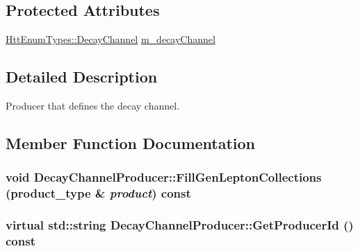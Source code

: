 \subsection*{Protected Attributes}
\begin{DoxyCompactItemize}
\item 
\hyperlink{classHttEnumTypes_a5e7e80b023df2c06dfd1e9c08f6efb35}{HttEnumTypes::DecayChannel} \hyperlink{classDecayChannelProducer_a4377dc18e06d6ddb5f7abbfb8a4b48e5}{m\_\-decayChannel}
\end{DoxyCompactItemize}


\subsection{Detailed Description}
Producer that defines the decay channel. 

\subsection{Member Function Documentation}
\hypertarget{classDecayChannelProducer_a6f207dff7857e0c2bacdca16ca9cea80}{
\subsubsection[{FillGenLeptonCollections}]{\setlength{\rightskip}{0pt plus 5cm}void DecayChannelProducer::FillGenLeptonCollections (product\_\-type \& {\em product}) const}}
\label{classDecayChannelProducer_a6f207dff7857e0c2bacdca16ca9cea80}
\hypertarget{classDecayChannelProducer_a151b0b47507bc8e521fe9acab96d38bc}{
\subsubsection[{GetProducerId}]{\setlength{\rightskip}{0pt plus 5cm}virtual std::string DecayChannelProducer::GetProducerId () const}}
\label{classDecayChannelProducer_a151b0b47507bc8e521fe9acab96d38bc}


